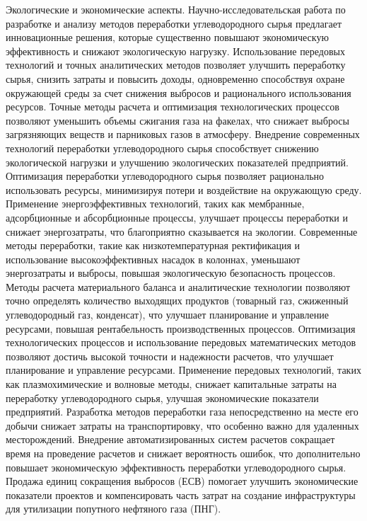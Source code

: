 \begin{multicols}{2}
Экологические и экономические аспекты. Научно-исследовательская работа
по разработке и анализу методов переработки углеводородного сырья
предлагает инновационные решения, которые существенно повышают
экономическую эффективность и снижают экологическую нагрузку.
Использование передовых технологий и точных аналитических методов
позволяет улучшить переработку сырья, снизить затраты и повысить доходы,
одновременно способствуя охране окружающей среды за счет снижения
выбросов и рационального использования ресурсов. Точные методы расчета и
оптимизация технологических процессов позволяют уменьшить объемы
сжигания газа на факелах, что снижает выбросы загрязняющих веществ и
парниковых газов в атмосферу. Внедрение современных технологий
переработки углеводородного сырья способствует снижению экологической
нагрузки и улучшению экологических показателей предприятий. Оптимизация
переработки углеводородного сырья позволяет рационально использовать
ресурсы, минимизируя потери и воздействие на окружающую среду.
Применение энергоэффективных технологий, таких как мембранные,
адсорбционные и абсорбционные процессы, улучшает процессы переработки и
снижает энергозатраты, что благоприятно сказывается на экологии.
Современные методы переработки, такие как низкотемпературная
ректификация и использование высокоэффективных насадок в колоннах,
уменьшают энергозатраты и выбросы, повышая экологическую безопасность
процессов. Методы расчета материального баланса и аналитические
технологии позволяют точно определять количество выходящих продуктов
(товарный газ, сжиженный углеводородный газ, конденсат), что улучшает
планирование и управление ресурсами, повышая рентабельность
производственных процессов. Оптимизация технологических процессов и
использование передовых математических методов позволяют достичь высокой
точности и надежности расчетов, что улучшает планирование и управление
ресурсами. Применение передовых технологий, таких как плазмохимические и
волновые методы, снижает капитальные затраты на переработку
углеводородного сырья, улучшая экономические показатели предприятий.
Разработка методов переработки газа непосредственно на месте его добычи
снижает затраты на транспортировку, что особенно важно для удаленных
месторождений. Внедрение автоматизированных систем расчетов сокращает
время на проведение расчетов и снижает вероятность ошибок, что
дополнительно повышает экономическую эффективность переработки
углеводородного сырья. Продажа единиц сокращения выбросов (ЕСВ) помогает
улучшить экономические показатели проектов и компенсировать часть затрат
на создание инфраструктуры для утилизации попутного нефтяного газа
(ПНГ).


\end{multicols}
